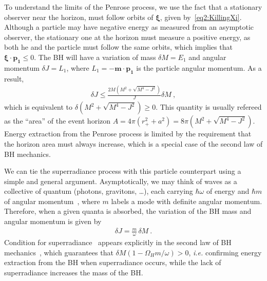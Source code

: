 To understand the limits of the Penrose process, we use the fact that a stationary observer near the horizon, must follow orbits of $\bm{\xi}$, given by~\eqref{eq2:KillingXi}. 
Although a particle may have negative energy as measured from an asymptotic observer, the stationary one at the horizon must measure a positive energy, as both he and the particle must follow the same orbits, which implies that $\bm{\xi} \cdot  \bm{p_1} \le 0$. The BH will have a variation of mass $\delta M =E_1$ and angular momentum $\delta J = L_1$, where $L_1 = - \bm{m} \cdot \bm{p_1}$ is the particle angular momentum. As a result,
\begin{align}
    \label{eq2:penroseCondition}
    \delta J \le \frac{2M\left(M^2+\sqrt{M^4-J^2}\right)}{J} \delta M ~,
\end{align}
which is equivalent to $\delta \left(M^2+\sqrt{M^4-J^2}\right) \ge 0$. This quantity is usually refereed as the ``area'' of the event horizon $A=4\pi(r_+^2+a^2)=8\pi\left(M^2+\sqrt{M^4-J^2}\right)$. Energy extraction from the Penrose process is limited by the requirement that the horizon area must always increase, which is a special case of the second law of BH mechanics. 

We can tie the superradiance process with this particle counterpart using a simple and general argument.
Asymptotically, we may think of waves as a collective of quantum (photons, gravitons, \dots), each carrying $\hbar \omega$ of energy and $\hbar m$ of angular momentum~\cite{Bekenstein1973}, where $m$ labels a mode with definite angular momentum.
Therefore, when a given quanta is absorbed, the variation of the BH mass and angular momentum is given by
\begin{align}
    \label{eq2:spinMassRatio}
    \delta J = \frac{m}{\omega} \,\delta M ~.
\end{align}
Condition for superradiance~ appears explicitly in the second law of BH mechanics~, which guarantees that $\delta M (1 - \Omega_H m /\omega)>0$, \emph{i.e.} confirming energy extraction from the BH when superradiance occurs, while the lack of superradiance increases the mass of the BH.


\cleardoublepage
